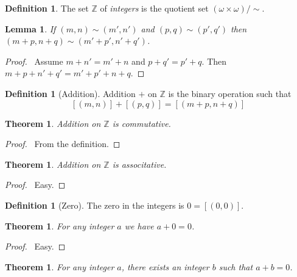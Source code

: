 \documentclass{report}
\let\qed\relax
\newtheorem{lemma}[axiom]{Lemma}
\newtheorem{theorem}[axiom]{Theorem}
\theoremstyle{definition}
\newtheorem{definition}[axiom]{Definition}
\begin{document}
    \begin{definition}
        The set $\mathbb{Z}$ of \emph{integers} is the quotient set $(\omega \times \omega) / \sim$.
    \end{definition}

    \begin{lemma}
        If $(m,n) \sim (m',n')$ and $(p,q) \sim (p',q')$ then $(m+p,n+q) \sim (m'+p',n'+q')$.
    \end{lemma}

    \begin{proof}
        \pf\ Assume $m + n' = m' + n$ and $p + q' = p' + q$. Then $m + p + n' + q' = m' + p' + n + q$. \qed
    \end{proof}

    \begin{definition}[Addition]
        Addition $+$ on $\mathbb{Z}$ is the binary operation such that
        \[ [(m,n)] + [(p,q)] = [(m+p,n+q)] \]
    \end{definition}

    \begin{theorem}
        Addition on $\mathbb{Z}$ is commutative.
    \end{theorem}

    \begin{proof}
        \pf\ From the definition. \qed
    \end{proof}

    \begin{theorem}
        Addition on $\mathbb{Z}$ is associtative.
    \end{theorem}

    \begin{proof}
        \pf\ Easy. \qed
    \end{proof}

    \begin{definition}[Zero]
        The zero in the integers is $0 = [(0,0)]$.
    \end{definition}

    \begin{theorem}
        For any integer $a$ we have $a + 0 = 0$.
    \end{theorem}

    \begin{proof}
        \pf\ Easy. \qed
    \end{proof}

    \begin{theorem}
        For any integer $a$, there exists an integer $b$ such that $a + b = 0$.
    \end{theorem}
\end{document}
